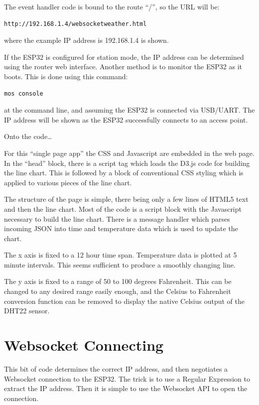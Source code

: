 \documentclass[letterpaper,]{book}
\begin{document}
The event handler code is bound to the route ``/'', so the URL will be:

\begin{verbatim}
http://192.168.1.4/websocketweather.html
\end{verbatim}

where the example IP address is 192.168.1.4 is shown.

If the ESP32 is configured for station mode, the IP address can be
determined using the router web interface. Another method is to monitor
the ESP32 as it boots. This is done using this command:

\begin{verbatim}
mos console
\end{verbatim}

at the command line, and assuming the ESP32 is connected via USB/UART.
The IP address will be shown as the ESP32 successfully connects to an
access point.

Onto the code\ldots{}

For this ``single page app'' the CSS and Javascript are embedded in the
web page. In the ``head'' block, there is a script tag which loads the
D3.js code for building the line chart. This is followed by a block of
conventional CSS styling which is applied to various pieces of the line
chart.

The structure of the page is simple, there being only a few lines of
HTML5 text and then the line chart. Most of the code is a script block
with the Javascript necessary to build the line chart. There is a
message handler which parses incoming JSON into time and temperature
data which is used to update the chart.

The x axis is fixed to a 12 hour time span. Temperature data is plotted
at 5 minute intervals. This seems sufficient to produce a smoothly
changing line.

The y axis is fixed to a range of 50 to 100 degrees Fahrenheit. This can
be changed to any desired range easily enough, and the Celsius to
Fahrenheit conversion function can be removed to display the native
Celsius output of the DHT22 sensor.

\section{Websocket Connecting}\label{websocket-connecting}

This bit of code determines the correct IP address, and then negotiates
a Websocket connection to the ESP32. The trick is to use a Regular
Expression to extract the IP address. Then it is simple to use the
Websocket API to open the connection.
\end{document}
